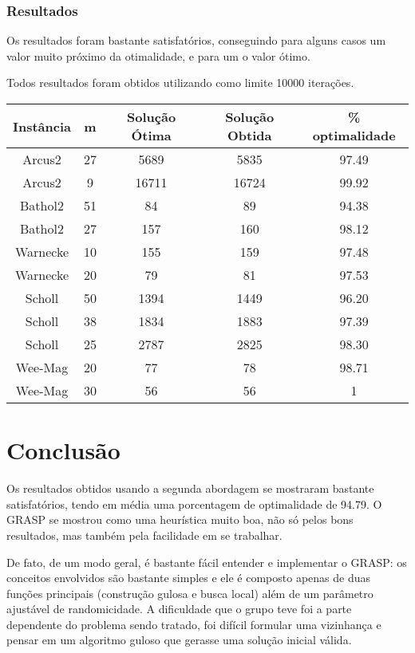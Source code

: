 \documentclass{report}
\begin{document}
\subsection{Resultados}

Os resultados foram bastante satisfatórios, conseguindo para alguns casos um
valor muito próximo da otimalidade, e para um o valor ótimo.

Todos resultados foram obtidos utilizando como limite 10000 iterações.

\begin{table}[htbp]
 \begin{tabular}{|c|c|c|c|c|}
  \hline
  \textbf{Instância} & \textbf{m} & \textbf{Solução Ótima} & \textbf{Solução Obtida} & \% optimalidade \\
  \hline
  Arcus2 & 27 & 5689 & 5835 & 97.49 \\
  \hline
  Arcus2 & 9 & 16711 & 16724 & 99.92 \\
  \hline
  Bathol2 & 51 & 84 & 89 & 94.38 \\
  \hline
  Bathol2 & 27 & 157 & 160 & 98.12 \\
  \hline
  Warnecke & 10 & 155 & 159 & 97.48 \\
  \hline
  Warnecke & 20 & 79 & 81 & 97.53 \\
  \hline
  Scholl & 50 & 1394 & 1449 & 96.20 \\
  \hline
  Scholl & 38 & 1834 & 1883 & 97.39 \\
  \hline
  Scholl & 25 & 2787 & 2825 & 98.30 \\
  \hline
  Wee-Mag & 20 & 77 & 78 & 98.71 \\
  \hline
  Wee-Mag & 30 & 56 & 56 & 1 \\
  \hline
 \end{tabular}
\end{table}

\chapter{Conclusão}

Os resultados obtidos usando a segunda abordagem se mostraram bastante
satisfatórios, tendo em média uma porcentagem de optimalidade de 94.79. O
GRASP se mostrou como uma heurística muito boa, não só pelos bons resultados,
mas também pela facilidade em se
trabalhar.

De fato, de um modo geral, é bastante fácil entender e implementar o GRASP:
os conceitos envolvidos são bastante simples e ele é composto apenas de duas
funções principais (construção gulosa e busca local) além de um parâmetro
ajustável de randomicidade. A dificuldade  que o grupo teve foi a parte
dependente do problema sendo tratado, foi difícil formular uma vizinhança e
pensar em um algoritmo guloso que gerasse uma solução inicial válida.
\end{document}

